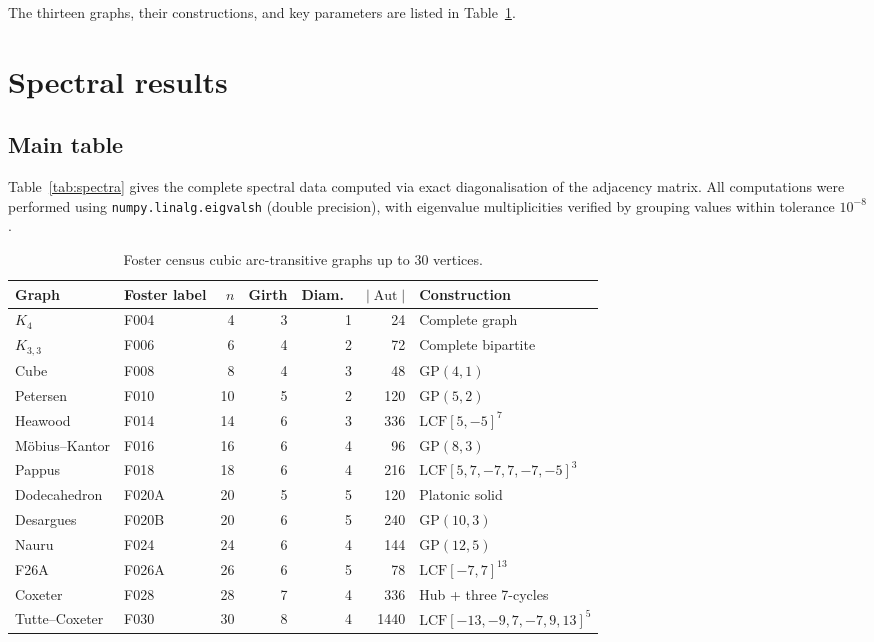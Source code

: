 \documentclass[11pt,a4paper]{article}
\DeclareMathOperator{\Aut}{Aut}
\begin{document}
\medskip
The thirteen graphs, their constructions, and key parameters are listed in Table~\ref{tab:census}.

\section{Spectral results}

\subsection{Main table}

Table~\ref{tab:spectra} gives the complete spectral data computed via exact diagonalisation of the adjacency matrix. All computations were performed using \texttt{numpy.linalg.eigvalsh} (double precision), with eigenvalue multiplicities verified by grouping values within tolerance $10^{-8}$.

\begin{table}[htbp]
\centering
\caption{Foster census cubic arc-transitive graphs up to 30 vertices.}
\label{tab:census}
\small
\begin{tabular}{llrrrrl}
\toprule
Graph & Foster label & $n$ & Girth & Diam.\ & $|\Aut|$ & Construction \\
\midrule
$K_4$             & F004   &  4 & 3 & 1 & 24    & Complete graph \\
$K_{3,3}$         & F006   &  6 & 4 & 2 & 72    & Complete bipartite \\
Cube              & F008   &  8 & 4 & 3 & 48    & $\mathrm{GP}(4,1)$ \\
Petersen          & F010   & 10 & 5 & 2 & 120   & $\mathrm{GP}(5,2)$ \\
Heawood           & F014   & 14 & 6 & 3 & 336   & $\mathrm{LCF}[5,-5]^7$ \\
M\"{o}bius--Kantor & F016   & 16 & 6 & 4 & 96    & $\mathrm{GP}(8,3)$ \\
Pappus            & F018   & 18 & 6 & 4 & 216   & $\mathrm{LCF}[5,7,-7,7,-7,-5]^3$ \\
Dodecahedron      & F020A  & 20 & 5 & 5 & 120   & Platonic solid \\
Desargues         & F020B  & 20 & 6 & 5 & 240   & $\mathrm{GP}(10,3)$ \\
Nauru             & F024   & 24 & 6 & 4 & 144   & $\mathrm{GP}(12,5)$ \\
F26A              & F026A  & 26 & 6 & 5 & 78    & $\mathrm{LCF}[-7,7]^{13}$ \\
Coxeter           & F028   & 28 & 7 & 4 & 336   & Hub + three 7-cycles \\
Tutte--Coxeter    & F030   & 30 & 8 & 4 & 1440  & $\mathrm{LCF}[-13,-9,7,-7,9,13]^5$ \\
\bottomrule
\end{tabular}
\end{table}
\end{document}
